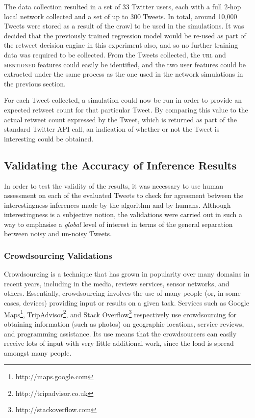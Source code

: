 The data collection resulted in a set of 33 Twitter users, each with a full 2-hop local network collected and a set of up to 300 Tweets. In total, around 10,000 Tweets were stored as a result of the crawl to be used in the simulations. It was decided that the previously trained regression model would be re-used as part of the retweet decision engine in this experiment also, and so no further training data was required to be collected. From the Tweets collected, the \textsc{url} and \textsc{mentioned} features could easily be identified, and the two user features could be extracted under the same process as the one used in the network simulations in the previous section.

For each Tweet collected, a simulation could now be run in order to provide an expected retweet count for that particular Tweet. By comparing this value to the actual retweet count expressed by the Tweet, which is returned as part of the standard Twitter API call, an indication of whether or not the Tweet is interesting could be obtained.



\subsection{Validating the Accuracy of Inference Results}
In order to test the validity of the results, it was necessary to use human assessment on each of the evaluated Tweets to check for agreement between the interestingness inferences made by the algorithm and by humans. Although interestingness is a subjective notion, the validations were carried out in such a way to emphasise a \textit{global} level of interest in terms of the general separation between noisy and un-noisy Tweets.


\subsubsection{Crowdsourcing Validations}
Crowdsourcing is a technique that has grown in popularity over many domains in recent years, including in the media, reviews services, sensor networks, and others. Essentially, crowdsourcing involves the use of many people (or, in some cases, devices) providing input or results on a given task. Services such as Google Maps\footnote{http://maps.google.com}, TripAdvisor\footnote{http://tripadvisor.co.uk}, and Stack Overflow\footnote{http://stackoverflow.com} respectively use crowdsourcing for obtaining information (such as photos) on geographic locations, service reviews, and programming assistance. Its use means that the crowdsourcers can easily receive lots of input with very little additional work, since the load is spread amongst many people.

